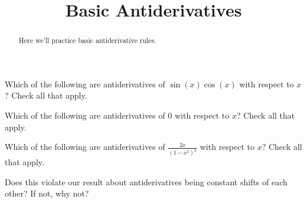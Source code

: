 \documentclass[handout]{ximera}
\title{Basic Antiderivatives}
\begin{document}
\begin{abstract}
  Here we'll practice basic antiderivative rules.
\end{abstract}
\maketitle

\begin{exercise}
Which of the following are antiderivatives of $\sin(x)\cos(x)$ with respect to $x$?  Check all that apply.

\begin{selectAll}
\end{selectAll}



\end{exercise}

\begin{exercise}
Which of the following are antiderivatives of $0$ with respect to $x$?  Check all that apply.

\begin{selectAll}
\end{selectAll}



\end{exercise}


\begin{exercise}
Which of the following are antiderivatives of $\frac{2x}{(1-x^2)^2}$ with respect to $x$?  Check all that apply.

\begin{selectAll}
\end{selectAll}

Does this violate our result about antiderivatives being constant shifts of each other?  If not, why not?

\end{exercise}
\end{document}
